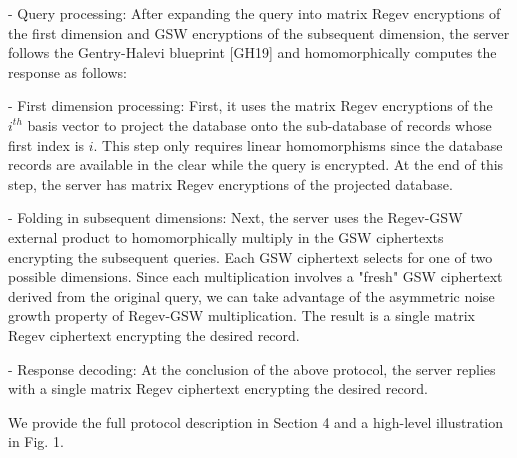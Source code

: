 - Query processing: After expanding the query into matrix Regev encryptions of the first dimension and GSW encryptions of the subsequent dimension, the server follows the Gentry-Halevi blueprint [GH19] and homomorphically computes the response as follows:

- First dimension processing: First, it uses the matrix Regev encryptions of the $i^{th}$ basis vector to project the database onto the sub-database of records whose first index is $i$. This step only requires linear homomorphisms since the database records are available in the clear while the query is encrypted. At the end of this step, the server has matrix Regev encryptions of the projected database.

- Folding in subsequent dimensions: Next, the server uses the Regev-GSW external product to homomorphically multiply in the GSW ciphertexts encrypting the subsequent queries. Each GSW ciphertext selects for one of two possible dimensions. Since each multiplication involves a "fresh" GSW ciphertext derived from the original query, we can take advantage of the asymmetric noise growth property of Regev-GSW multiplication. The result is a single matrix Regev ciphertext encrypting the desired record.

- Response decoding: At the conclusion of the above protocol, the server replies with a single matrix Regev ciphertext encrypting the desired record.

We provide the full protocol description in Section 4 and a high-level illustration in Fig. 1.
